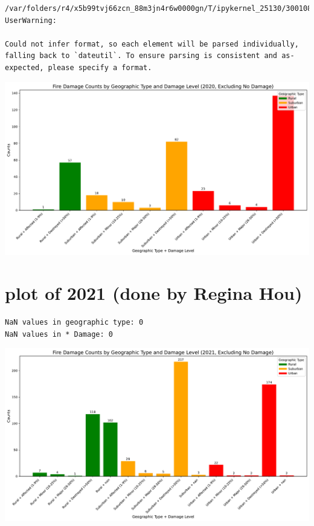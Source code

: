 \documentclass[
  letterpaper,
  DIV=11,
  numbers=noendperiod]{scrartcl}
\begin{document}
\begin{verbatim}
/var/folders/r4/x5b99tvj66zcn_88m3jn4r6w0000gn/T/ipykernel_25130/3001088990.py:3: UserWarning:

Could not infer format, so each element will be parsed individually, falling back to `dateutil`. To ensure parsing is consistent and as-expected, please specify a format.
\end{verbatim}

\includegraphics{Final Writeup_files/figure-pdf/cell-12-output-2.pdf}

\section{plot of 2021 (done by Regina
Hou)}\label{plot-of-2021-done-by-regina-hou}

\begin{verbatim}
NaN values in geographic type: 0
NaN values in * Damage: 0
\end{verbatim}

\includegraphics{Final Writeup_files/figure-pdf/cell-14-output-1.pdf}
\end{document}
